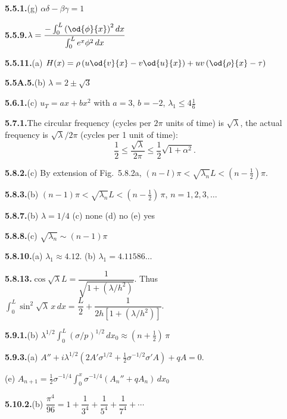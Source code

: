 \medskip
\textbf{5.5.1.}\quad (g) $\alpha\delta - \beta\gamma = 1$

\medskip
\textbf{5.5.9.}\quad $\lambda = \dfrac{-\int_0^L\left(\od{\phi}{x}\right)^2 dx}{\int_0^L e^x \phi^2\,dx}$

\medskip
\textbf{5.5.11.}\quad (a) $H(x) = \rho\left(u\od{v}{x} - v\od{u}{x}\right) + uv\left(\od{\rho}{x} - \tau\right)$%

\medskip
\textbf{5.5A.5.}\quad (b) $\lambda = 2 \pm \sqrt{3}$

\medskip
\textbf{5.6.1.}\quad (c) $u_T = ax + bx^2$ with $a = 3$, $b = -2$, $\lambda_1 \leq 4\frac{1}{6}$

\medskip
\textbf{5.7.1.}\quad The circular frequency (cycles per $2\pi$ units of time) is $\sqrt{\lambda}$, the actual frequency is $\sqrt{\lambda}/2\pi$ (cycles per 1 unit of time):
\[
\frac{1}{2} \leq \frac{\sqrt{\lambda}}{2\pi} \leq \frac{1}{2}\sqrt{1+\alpha^2}.
\]

\medskip
\textbf{5.8.2.}\quad (c) By extension of Fig.~5.8.2a, $(n-l)\pi < \sqrt{\lambda_n}L < (n-\frac{1}{2})\pi$.

\medskip
\textbf{5.8.3.}\quad (b) $(n-1)\pi < \sqrt{\lambda_n}L < (n-\frac{1}{2})\,\pi$, $n = 1, 2, 3, \ldots$

\medskip
\textbf{5.8.7.}\quad (b) $\lambda = 1/4$ \quad (c) none \quad (d) no \quad (e) yes

\medskip
\textbf{5.8.8.}\quad (c) $\sqrt{\lambda_n} \sim (n-1)\pi$

\medskip
\textbf{5.8.10.}\quad (a) $\lambda_1 \approx 4.12$. \qquad (b) $\lambda_1 = 4.11586\ldots$

\medskip
\textbf{5.8.13.}\quad $\cos\sqrt{\lambda}L = \dfrac{1}{\sqrt{1+(\lambda/h^2)}}$. Thus $\int_0^L\sin^2\sqrt{\lambda}\,x\,dx = \dfrac{L}{2}+\dfrac{1}{2h[1+(\lambda/h^2)]}$.

\medskip
\textbf{5.9.1.}\quad (b) $\lambda^{1/2}\int_0^L (\sigma/p)^{1/2}\,dx_0 \approx (n+\frac{1}{2})\,\pi$

\medskip
\textbf{5.9.3.}\quad (a) $A'' + i\lambda^{1/2}\left(2A'\sigma^{1/2}+\frac{1}{2}\sigma^{-1/2}\sigma'A\right)+qA = 0$.

\quad (e) $A_{n+1} = \frac{1}{2}\sigma^{-1/4}\int_0^x \sigma^{-1/4}\left(A_n''+qA_n\right)\,dx_0$

\medskip
\textbf{5.10.2.}\quad (b) $\dfrac{\pi^4}{96} = 1 + \dfrac{1}{3^4} + \dfrac{1}{5^4} + \dfrac{1}{7^4} + \cdots$

